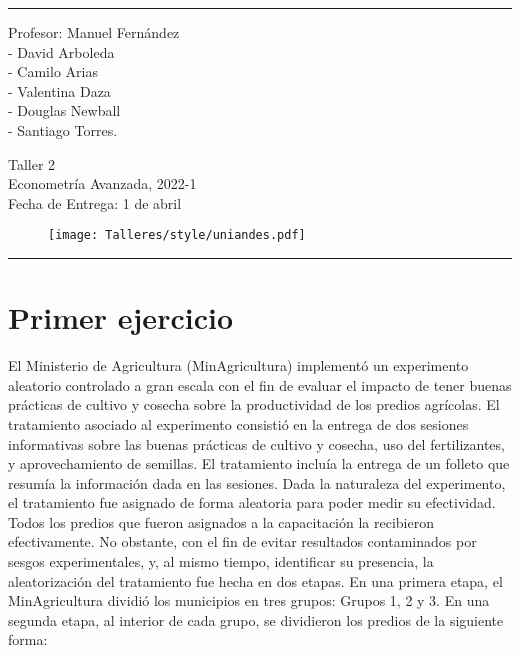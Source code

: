 \documentclass[a4paper]{article}
\begin{document}

\fancyhead[C]{}
\hrule \medskip 
\begin{minipage}{0.295\textwidth} 
\raggedright
Profesor: Manuel Fernández\\
\vspace{2mm}
- David Arboleda\\
- Camilo Arias\\
- Valentina Daza\\
- Douglas Newball\\
- Santiago Torres.
\end{minipage}
\begin{minipage}{0.4\textwidth} 
\centering 
\huge 
Taller 2\\ 
\vspace{2mm}
\normalsize 
Econometría Avanzada, 2022-1\\ 
Fecha de Entrega: 1 de abril
\end{minipage}
\begin{minipage}{0.295\textwidth} 
\begin{figure}[H]
\raggedleft
\texttt{[image: Talleres/style/uniandes.pdf]}
\end{figure}
\hfill
\end{minipage}
\medskip\hrule 
\bigskip


\section*{Primer ejercicio}





El Ministerio de Agricultura (MinAgricultura) implementó un experimento aleatorio controlado a gran escala con el fin de evaluar el impacto de tener buenas prácticas de cultivo y cosecha sobre la productividad de los predios agrícolas. El tratamiento asociado al experimento consistió en la entrega de dos sesiones informativas sobre las buenas prácticas de cultivo y cosecha, uso del fertilizantes, y aprovechamiento de semillas. El tratamiento incluía la entrega de un folleto que resumía la información dada en las sesiones. Dada la naturaleza del experimento, el tratamiento fue asignado de forma aleatoria para poder medir su efectividad. Todos los predios que fueron asignados a la capacitación la recibieron efectivamente.  No obstante, con el fin de evitar resultados contaminados por sesgos experimentales, y, al mismo tiempo, identificar su presencia, la aleatorización del tratamiento fue hecha en dos etapas. En una primera etapa, el MinAgricultura dividió los municipios en tres grupos: Grupos 1, 2 y 3. En una segunda etapa, al interior de cada grupo, se dividieron los predios de la siguiente forma: 
\end{document}
